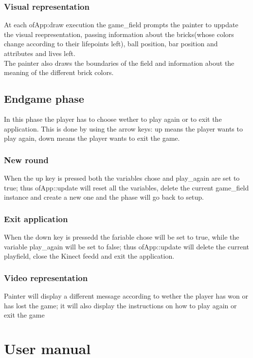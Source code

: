 \documentclass[]{article}
\begin{document}
\subsubsection{Visual representation}
At each ofApp:draw execution the game\_field prompts the painter to uppdate the visual reepresentation, passing information about the bricks(whose colors change according to their lifepoints left), ball position, bar position and attributes and lives left.\\
The painter also draws the boundaries of the field and information about the meaning of the different brick colors.
\newpage
\subsection{Endgame phase}
In this phase the player has to choose wether to play again or to exit the application. This is done by using the arrow keys: up means the player wants to play again, down means the player wants to exit the game.
\subsubsection{New round}
When the up key is pressed both the variables chose and play\_again are set to true; thus ofApp::update will reset all the variables, delete the current game\_field instance and create a new one and the phase will go back to setup.
\subsubsection{Exit application}
When the down key is pressedd the fariable chose will be set to true, while the variable play\_again will be set to false; thus ofApp::update will delete the current playfield, close the Kinect feedd and exit the application.
\subsubsection{Video representation}
Painter will display a different message according to wether the player has won or has lost the game; it will also display the instructions on how to play again or exit the game  
\newpage
\section{User manual}
\end{document}
